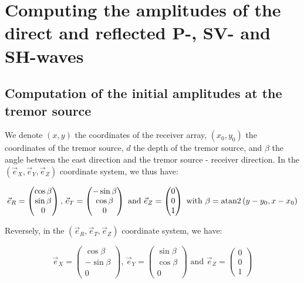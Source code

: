 \documentclass[workdone.tex]{subfiles}
\begin{document}
\section{Computing the amplitudes of the direct and reflected P-, SV- and SH-waves}

\subsection{Computation of the initial amplitudes at the tremor source}

We denote $\left( x, y \right)$ the coordinates of the receiver array, $\left( x_0, y_0 \right)$ the coordinates of the tremor source, $d$ the depth of the tremor source, and $\beta$ the angle between the east direction and the tremor source - receiver direction. In the $\left( \vec{e}_X, \vec{e}_Y, \vec{e}_Z \right)$ coordinate system, we thus have:

\begin{equation}
\vec{e}_R = \begin{pmatrix}
\cos \beta \\
\sin \beta \\
0
\end{pmatrix} \text{, } \vec{e}_T = \begin{pmatrix}
- \sin \beta \\
\cos \beta \\
0
\end{pmatrix} \text{ and } \vec{e}_Z = \begin{pmatrix}
0 \\
0 \\
1
\end{pmatrix} \text{ with } \beta = \operatorname{atan2} \left(y - y_0 , x - x_0 \right)
\end{equation}

Reversely, in the $\left( \vec{e}_R, \vec{e}_T, \vec{e}_Z \right)$ coordinate system, we have:

\begin{equation}
\vec{e}_X = \begin{pmatrix}
\cos \beta \\
- \sin \beta \\
0
\end{pmatrix} \text{, } \vec{e}_Y = \begin{pmatrix}
\sin \beta \\
\cos \beta \\
0
\end{pmatrix} \text{ and } \vec{e}_Z = \begin{pmatrix}
0 \\
0 \\
1
\end{pmatrix}
\end{equation}
\end{document}
